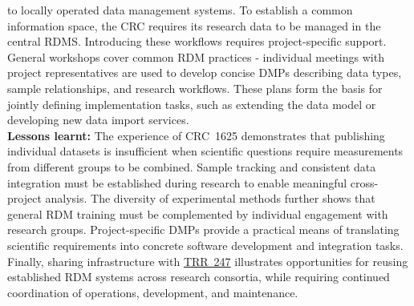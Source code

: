 \documentclass{eceasst}
\begin{document}
to locally operated data management systems.
To establish a common information space, the CRC
requires its research data to be managed in the central RDMS.
Introducing these workflows requires project-specific
support. General workshops cover common RDM
practices - individual meetings with project
representatives are used to develop concise DMPs describing data types, sample
relationships, and research workflows. These plans
form the basis for jointly defining implementation
tasks, such as extending the data model or developing
new data import services.
\\
\noindent\textbf{Lessons learnt:}
The experience of CRC~1625 demonstrates that
publishing individual datasets is insufficient
when scientific questions require measurements
from different groups to be combined. Sample
tracking and consistent data integration must
be established during research to enable
meaningful cross-project analysis.
The diversity of experimental methods further
shows that general RDM training must be
complemented by individual engagement with
research groups. Project-specific DMPs
provide a practical means of translating
scientific requirements into concrete software
development and integration tasks.
Finally, sharing infrastructure with \hyperref[subsec:trr247]{TRR~247}
illustrates opportunities for reusing established
RDM systems across research consortia, while
requiring continued coordination of operations,
development, and maintenance.
\end{document}
